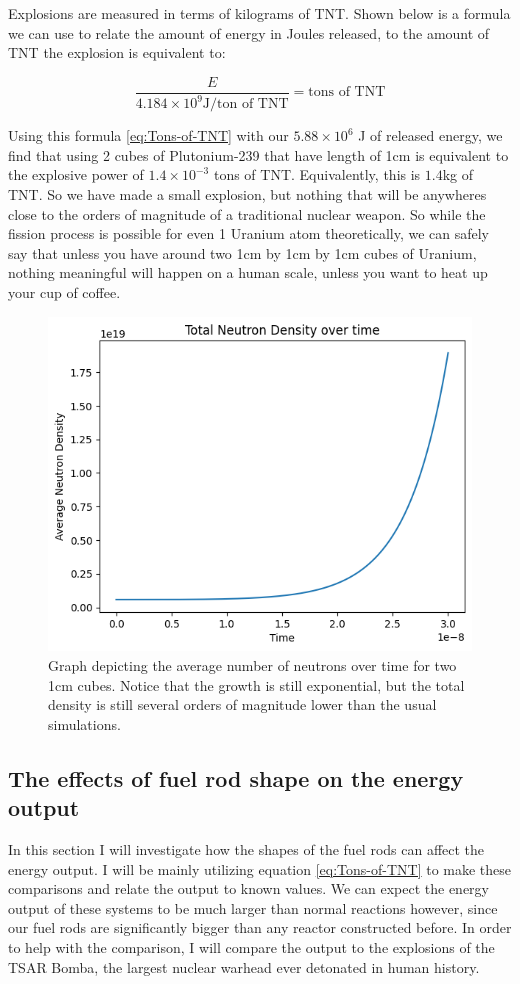 \documentclass[letterpaper, 12pt]{article}
\newcommand{\eqlabel}[1]{\label{eq:#1}}
\begin{document}
         Explosions are measured in terms of kilograms of TNT. Shown below is a formula we can use to relate the amount of energy in Joules released, to the amount of TNT the explosion is equivalent to:

         \begin{equation}
            \frac{E}{4.184 \times 10^9 \text{J/ton of TNT}} = \text{tons of TNT}
            \eqlabel{Tons-of-TNT}
         \end{equation}

         Using this formula \eqref{eq:Tons-of-TNT} with our  $5.88 \times 10^6$ J of released energy, we find that using 2 cubes of Plutonium-239 that have length of 1cm is equivalent to the explosive power of $1.4 \times 10^{-3}$ tons of TNT. Equivalently, this is $1.4$kg of TNT. So we have made a small explosion, but nothing that will be anywheres close to the orders of magnitude of a traditional nuclear weapon. So while the fission process is possible for even 1 Uranium atom theoretically, we can safely say that unless you have around two 1cm by 1cm by 1cm cubes of Uranium, nothing meaningful will happen on a human scale, unless you want to heat up your cup of coffee.

         \begin{figure}[b!]
            \centering
            \includegraphics[width=0.4\linewidth]{Graphs/1cm-Cube.png}
            \caption{Graph depicting the average number of neutrons over time for two 1cm cubes. Notice that the growth is still exponential, but the total density is still several orders of magnitude lower than the usual simulations.}
            \label{img:1cm-Plutonium-Graph}
         \end{figure}

      \subsection{The effects of fuel rod shape on the energy output}
         In this section I will investigate how the shapes of the fuel rods can affect the energy output. I will be mainly utilizing equation \eqref{eq:Tons-of-TNT} to make these comparisons and relate the output to known values. We can expect the energy output of these systems to be much larger than normal reactions however, since our fuel rods are significantly bigger than any reactor constructed before. In order to help with the comparison, I will compare the output to the explosions of the TSAR Bomba, the largest nuclear warhead ever detonated in human history.\\
\end{document}
